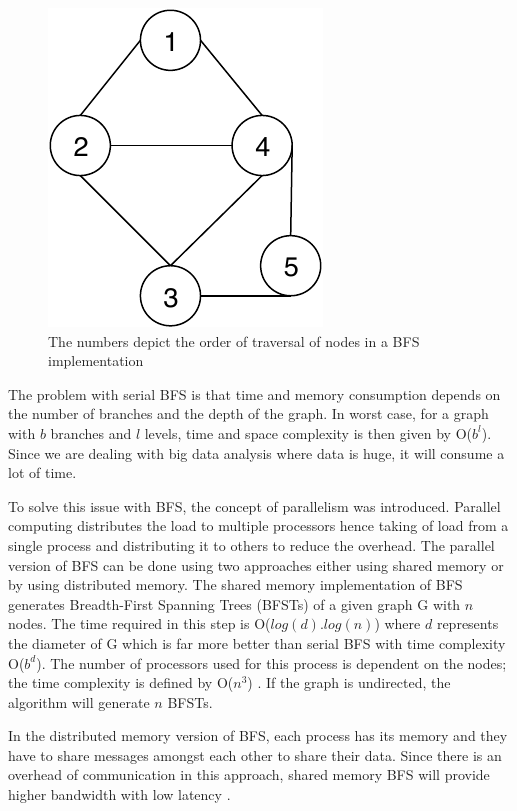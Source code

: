 \documentclass[journal,twoside,web]{ieeecolor}
\begin{document}
\begin{figure}[!h]
    \centerline{\includegraphics[scale=1]{figures/bfs.pdf}}
    \caption{The numbers depict the order of traversal of nodes in a BFS implementation}
    \label{fig1}
\end{figure}

The problem with serial BFS is that time and memory consumption depends on the number of branches and the depth of the graph. In worst case, for a graph with ${b}$ branches and ${l}$ levels, time and space complexity is then given by O($b^l$). Since we are dealing with big data analysis where data is huge, it will consume a lot of time.

To solve this issue with BFS, the concept of parallelism was introduced. Parallel computing distributes the load to multiple processors hence taking of load from a single process and distributing it to others to reduce the overhead. The parallel version of BFS can be done using two approaches either using shared memory or by using distributed memory. The shared memory implementation of BFS generates Breadth-First Spanning Trees (BFSTs) of a given graph G with $n$ nodes. The time required in this step is O($log(d).log(n)$) where $d$ represents the diameter of G which is far more better than serial BFS with time complexity O($b^d$). The number of processors used for this process is dependent on the nodes; the time complexity is defined by O($n^3$) \cite{36}. If the graph is undirected, the algorithm will generate $n$ BFSTs.

In the distributed memory version of BFS, each process has its memory and they have to share messages amongst each other to share their data. Since there is an overhead of communication in this approach, shared memory BFS will provide higher bandwidth with low latency \cite{37}.
\end{document}
